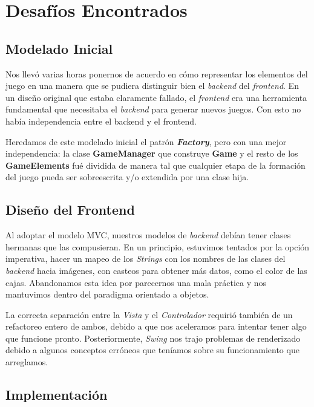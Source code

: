 \documentclass[a4paper,12pt,titlepage]{article}
\begin{document}
\section{Desafíos Encontrados}

\subsection{Modelado Inicial}

Nos llevó varias horas ponernos de acuerdo en cómo representar los elementos del juego en una manera que se pudiera distinguir bien el \emph{backend} del \emph{frontend}. En un diseño original que estaba claramente fallado, el \emph{frontend} era una herramienta fundamental que necesitaba el \emph{backend} para generar nuevos juegos. Con esto no había independencia entre el backend y el frontend.

Heredamos de este modelado inicial el patrón \emph{\textbf{Factory}}, pero con una mejor independencia: la clase \textbf{GameManager} que construye \textbf{Game} y el resto de los \textbf{GameElements} fué dividida de manera tal que cualquier etapa de la formación del juego pueda ser sobreescrita y/o extendida por una clase hija.

\subsection{Diseño del Frontend}

Al adoptar el modelo MVC, nuestros modelos de \emph{backend} debían tener clases hermanas que las compusieran. En un principio, estuvimos tentados por la opción imperativa, hacer un mapeo de los \emph{Strings} con los nombres de las clases del \emph{backend} hacia imágenes, con casteos para obtener más datos, como el color de las cajas. Abandonamos esta idea por parecernos una mala práctica y nos mantuvimos dentro del paradigma orientado a objetos.

La correcta separación entre la \emph{Vista} y el \emph{Controlador} requirió también de un refactoreo entero de ambos, debido a que nos aceleramos para intentar tener algo que funcione pronto. Posteriormente, \emph{Swing} nos trajo problemas de renderizado debido a algunos conceptos erróneos que teníamos sobre su funcionamiento que arreglamos.

\subsection{Implementación}
\end{document}
